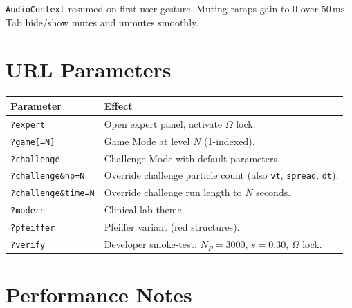 \documentclass[12pt, a4paper]{article}
\begin{document}
\texttt{AudioContext} resumed on first user gesture. Muting ramps gain to 0
over $50\,\mathrm{ms}$. Tab hide/show mutes and unmutes smoothly.

\section{URL Parameters}
\label{sec:url}

\begin{longtable}{@{}lp{11cm}@{}}
  \toprule
  Parameter & Effect \\
  \midrule
  \texttt{?expert}              & Open expert panel, activate $\Omega$ lock. \\
  \texttt{?game[=N]}            & Game Mode at level $N$ (1-indexed). \\
  \texttt{?challenge}           & Challenge Mode with default parameters. \\
  \texttt{?challenge\&np=N}     & Override challenge particle count (also \texttt{vt}, \texttt{spread}, \texttt{dt}). \\
  \texttt{?challenge\&time=N}   & Override challenge run length to $N$ seconds. \\
  \texttt{?modern}              & Clinical lab theme. \\
  \texttt{?pfeiffer}            & Pfeiffer variant (red structures). \\
  \texttt{?verify}              & Developer smoke-test: $N_P=3000$, $s=0.30$, $\Omega$ lock. \\
  \bottomrule
\end{longtable}

\section{Performance Notes}
\end{document}
